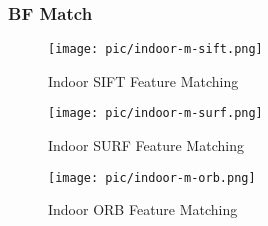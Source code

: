 \documentclass[paper=a4, fontsize=11pt]{scrartcl} %
\numberwithin{equation}{section} %
\numberwithin{figure}{section} %
\numberwithin{table}{section} %
\begin{document}
\subsubsection{BF Match}




\begin{figure}[H]
\centering
\texttt{[image: pic/indoor-m-sift.png]}
\caption{Indoor SIFT Feature Matching}
\label{fig:indoor-m-sift}
\end{figure}

\begin{figure}[H]
\centering
\texttt{[image: pic/indoor-m-surf.png]}
\caption{Indoor SURF Feature Matching}
\label{fig:indoor-m-surf}
\end{figure}

\begin{figure}[H]
\centering
\texttt{[image: pic/indoor-m-orb.png]}
\caption{Indoor ORB Feature Matching}
\label{fig:indoor-m-orb}
\end{figure}




\end{document}
